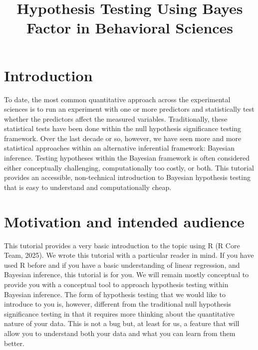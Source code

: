 \documentclass[
  doc,
  floatsintext,
  longtable,
  nolmodern,
  notxfonts,
  notimes,
  colorlinks=true,linkcolor=blue,citecolor=blue,urlcolor=blue]{apa7}
\title{Hypothesis Testing Using Bayes Factor in Behavioral Sciences}
\begin{document}
\maketitle



\setcounter{secnumdepth}{3}

\setlength\LTleft{0pt}




\section{Introduction}\label{introduction}

To date, the most common quantitative approach across the experimental
sciences is to run an experiment with one or more predictors and
statistically test whether the predictors affect the measured variables.
Traditionally, these statistical tests have been done within the null
hypothesis significance testing framework. Over the last decade or so,
however, we have seen more and more statistical approaches within an
alternative inferential framework: Bayesian inference. Testing
hypotheses within the Bayesian framework is often considered either
conceptually challenging, computationally too costly, or both. This
tutorial provides an accessible, non-technical introduction to Bayesian
hypothesis testing that is easy to understand and computationally cheap.

\section{Motivation and intended
audience}\label{motivation-and-intended-audience}

This tutorial provides a very basic introduction to the topic using R (R
Core Team, 2025). We wrote this tutorial with a particular reader in
mind. If you have used R before and if you have a basic understanding of
linear regression, and Bayesian inference, this tutorial is for you. We
will remain mostly conceptual to provide you with a conceptual tool to
approach hypothesis testing within Bayesian inference. The form of
hypothesis testing that we would like to introduce to you is, however,
different from the traditional null hypothesis significance testing in
that it requires more thinking about the quantitative nature of your
data. This is not a bug but, at least for us, a feature that will allow
you to understand both your data and what you can learn from them
better.
\end{document}
